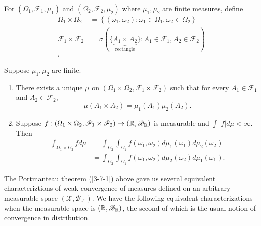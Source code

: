 \begin{definition}[Products]
	For $\left( \Omega_1,\mathscr{F}_1, \mu_1 \right)$ and $\left( \Omega_2, \mathscr{F}_2, \mu_2 \right)$ where $\mu_1,\mu_2$ are finite measures, define 
	\begin{align*}
		\Omega_1 \times \Omega_2 &= \left\{\left( \omega_1, \omega_2 \right): \omega_1 \in \Omega_1, \omega_2 \in \Omega_2 \right\} \\
		\mathscr{F}_1 \times \mathscr{F}_2 &= \sigma\left( \{\underbrace{A_1 \times A_2}_{\text{rectangle}}\} : A_1 \in \mathscr{F}_1, A_2 \in \mathscr{F}_2 \right) \\
	.\end{align*}
\end{definition}

\begin{theorem}[Fubini]
	Suppose $\mu_1,\mu_2$ are finite.	\begin{enumerate}[label=(\roman*)]
		\item There exists a unique $\mu$ on $\left( \Omega_1 \times \Omega_2, \mathscr{F}_1 \times \mathscr{F}_2 \right)$ such that for every $A_1 \in \mathscr{F}_1$ and $A_2 \in \mathscr{F}_2$,
			\[
				\mu\left( A_1 \times A_2 \right) = \mu_1(A_1) \mu_2(A_2)
			.\] 
		\item Suppose $f: \left( \Omega_1 \times \Omega_2, \mathscr{F}_1 \times \mathscr{F}_2 \right)\to \left( \mathbb{R},\mathscr{B}_{\mathbb{R}} \right)$ is measurable and $\int \left| f \right| d\mu < \infty$. Then 
			\begin{align*}
				\int_{\Omega_1 \times \Omega_2} f d\mu &= \int_{\Omega_2} \int_{\Omega_1} f(\omega_1,\omega_2) d\mu_1(\omega_1) d\mu_2(\omega_2) \\
							&= \int_{\Omega_2}\int_{\Omega_1} f(\omega_1,\omega_2) d\mu_2(\omega_2) d\mu_1(\omega_1)
			.\end{align*}
	\end{enumerate}
\end{theorem}

The Portmanteau theorem (\ref{3-7-1}) above gave us several equivalent characteriztions of weak convergence of measures defined on an arbitrary measurable space $\left( \mathscr{X}, \mathscr{B}_{\mathscr{X}} \right)$. We have the following equivalent characterizations when the measurable space is $\left( \mathbb{R}, \mathscr{B}_{\mathbb{R}} \right)$, the second of which is the usual notion of convergence in distribution.

